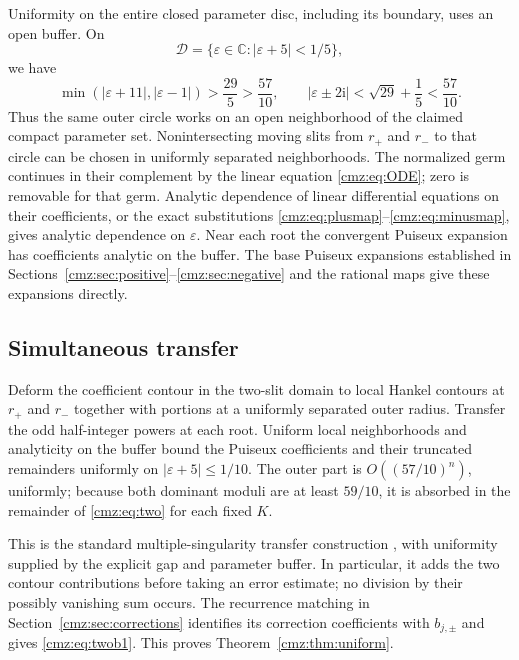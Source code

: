 \documentclass[11pt,letterpaper]{article}
\numberwithin{equation}{section}
\theoremstyle{definition}\newtheorem{definition}[theorem]{Definition}
\theoremstyle{remark}\newtheorem{remark}[theorem]{Remark}
\newcommand{\eps}{\varepsilon}
\newcommand{\ii}{\mathrm i}
\newcommand{\C}{\mathbb C}
\newcommand{\disc}{\mathcal D}
\begin{document}
Uniformity on the entire closed parameter disc, including its boundary, uses an open buffer. On
\begin{equation}
\disc=\{\eps\in\C:|\eps+5|<1/5\},
\label{cmz:eq:buffer}
\end{equation}
we have
\[
\min(|\eps+11|,|\eps-1|)>\frac{29}{5}>\frac{57}{10},\qquad
|\eps\pm2\ii|<\sqrt{29}+\frac15<\frac{57}{10}.
\]
Thus the same outer circle works on an open neighborhood of the claimed compact parameter set. Nonintersecting moving slits from $r_+$ and $r_-$ to that circle can be chosen in uniformly separated neighborhoods. The normalized germ continues in their complement by the linear equation \eqref{cmz:eq:ODE}; zero is removable for that germ. Analytic dependence of linear differential equations on their coefficients, or the exact substitutions \eqref{cmz:eq:plusmap}--\eqref{cmz:eq:minusmap}, gives analytic dependence on $\eps$. Near each root the convergent Puiseux expansion has coefficients analytic on the buffer. The base Puiseux expansions established in Sections~\ref{cmz:sec:positive}--\ref{cmz:sec:negative} and the rational maps give these expansions directly.

\subsection{Simultaneous transfer}
Deform the coefficient contour in the two-slit domain to local Hankel contours at $r_+$ and $r_-$ together with portions at a uniformly separated outer radius. Transfer the odd half-integer powers at each root. Uniform local neighborhoods and analyticity on the buffer bound the Puiseux coefficients and their truncated remainders uniformly on $|\eps+5|\leq1/10$. The outer part is $O((57/10)^n)$, uniformly; because both dominant moduli are at least $59/10$, it is absorbed in the remainder of \eqref{cmz:eq:two} for each fixed $K$.

This is the standard multiple-singularity transfer construction \cite[Theorem VI.5]{FS}, with uniformity supplied by the explicit gap and parameter buffer. In particular, it adds the two contour contributions before taking an error estimate; no division by their possibly vanishing sum occurs. The recurrence matching in Section~\ref{cmz:sec:corrections} identifies its correction coefficients with $b_{j,\pm}$ and gives \eqref{cmz:eq:twob1}. This proves Theorem~\ref{cmz:thm:uniform}.
\end{document}

